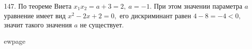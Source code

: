 147. По теореме Виета $x_1x_2=a+3=2,\ a=-1.$ При этом значении параметра $a$ уравнение имеет вид $x^2-2x+2=0,$ его дискриминант равен $4-8=-4<0,$ значит такого значения $a$ не существует.

ewpage

